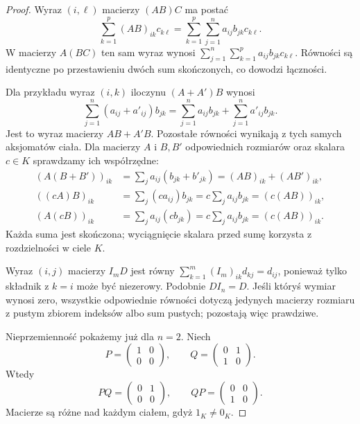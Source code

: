 \begin{proof}
Wyraz \((i,\ell)\) macierzy \((AB)C\)
ma postać
\[
 \sum_{k=1}^{p}(AB)_{ik}c_{k\ell}
 =\sum_{k=1}^{p}\sum_{j=1}^{n}
    a_{ij}b_{jk}c_{k\ell}.
\]
W macierzy \(A(BC)\) ten sam wyraz
wynosi \(\sum_{j=1}^{n}\sum_{k=1}^{p}
a_{ij}b_{jk}c_{k\ell}\).
Równości są identyczne po przestawieniu
dwóch sum skończonych, co dowodzi łączności.

Dla przykładu wyraz \((i,k)\) iloczynu
\((A+A')B\) wynosi
\[
 \sum_{j=1}^{n}(a_{ij}+a'_{ij})b_{jk}
 =\sum_{j=1}^{n}a_{ij}b_{jk}
  +\sum_{j=1}^{n}a'_{ij}b_{jk}.
\]
Jest to wyraz macierzy \(AB+A'B\).
Pozostałe równości wynikają z tych samych aksjomatów ciała.
Dla macierzy \(A\) i \(B,B'\) odpowiednich rozmiarów
oraz skalara \(c\in K\) sprawdzamy ich współrzędne:
\[
 \begin{aligned}
 (A(B+B'))_{ik}&=\sum_j a_{ij}(b_{jk}+b'_{jk})
   =(AB)_{ik}+(AB')_{ik},\\
 ((cA)B)_{ik}&=\sum_j(ca_{ij})b_{jk}
   =c\sum_j a_{ij}b_{jk}=(c(AB))_{ik},\\
 (A(cB))_{ik}&=\sum_j a_{ij}(cb_{jk})
   =c\sum_j a_{ij}b_{jk}=(c(AB))_{ik}.
 \end{aligned}
\]
Każda suma jest skończona; wyciągnięcie skalara
przed sumę korzysta z rozdzielności w ciele \(K\).

Wyraz \((i,j)\) macierzy \(I_mD\)
jest równy
\(\sum_{k=1}^{m}(I_m)_{ik}d_{kj}=d_{ij}\),
ponieważ tylko składnik z \(k=i\)
może być niezerowy.
Podobnie \(DI_n=D\).
Jeśli któryś wymiar wynosi zero,
wszystkie odpowiednie równości dotyczą
jedynych macierzy rozmiaru z pustym
zbiorem indeksów albo sum pustych;
pozostają więc prawdziwe.

Nieprzemienność pokażemy już dla \(n=2\).
Niech
\[
 P=\begin{pmatrix}1&0\\0&0\end{pmatrix},
 \qquad
 Q=\begin{pmatrix}0&1\\1&0\end{pmatrix}.
\]
Wtedy
\[
 PQ=\begin{pmatrix}0&1\\0&0\end{pmatrix},
 \qquad
 QP=\begin{pmatrix}0&0\\1&0\end{pmatrix}.
\]
Macierze są różne nad każdym ciałem,
gdyż \(1_K\neq0_K\).
\end{proof}

